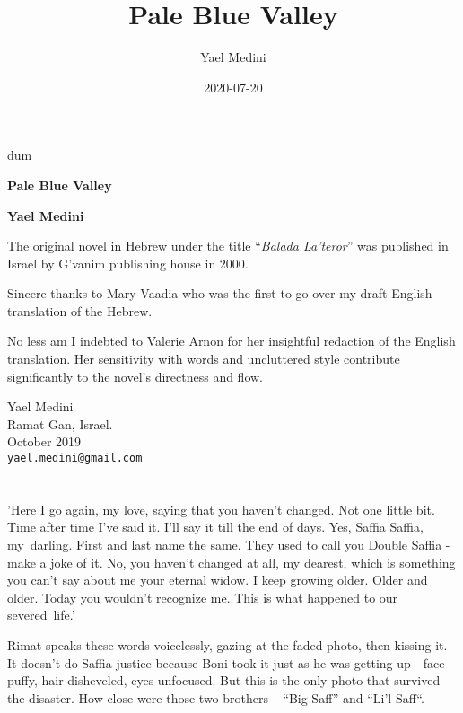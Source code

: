 \documentclass[twoside,11pt]{book}
\title{Pale Blue Valley}
\author{Yael Medini}
\date{2020-07-20}
\begin{document}
\thispagestyle{empty}
{\nullfont dum}
\vspace{.3\textheight}
\begin{center}
{\Huge \textbf{Pale Blue Valley}}

\bigskip

\textbf{\Large Yael Medini}
\end{center}
\vspace{.2\textheight}

The original novel in Hebrew under the title ``\emph{Balada La'teror}'' was
published in Israel by G'vanim publishing house in 2000.

\bigskip
Sincere thanks to Mary Vaadia who was the first to go over my draft
English translation of the Hebrew.

\bigskip
No less am I indebted to Valerie Arnon for her insightful redaction of
the English translation. Her sensitivity with words and uncluttered
style contribute significantly to the novel's directness and flow.

\bigskip
{
\parindent=0pt
Yael Medini\\
Ramat Gan, Israel. \\
October 2019 \\
\texttt{yael.medini@gmail.com}
}


\chapter{}

'Here I go again, my love, saying that you haven't changed. Not one
little bit. Time after time I've said it. I'll say it till the end of
days. Yes, Saffia Saffia, my~darling. First and last name the
same. They used to call you Double Saffia - make a joke of it. No, you
haven't changed at all, my dearest, which is something you can't say
about me your eternal widow. I keep growing older. Older and older.
Today you wouldn't recognize me. This is what happened to our
severed~life.'

Rimat speaks these words voicelessly, gazing at the faded photo, then kissing it.
It doesn't do Saffia
justice because Boni took it just as he was getting up - face
puffy, hair disheveled,
eyes unfocused. But this is the only photo that survived the
disaster. How close were those two brothers -- ``Big-Saff'' and
``Li'l-Saff``.
\end{document}
